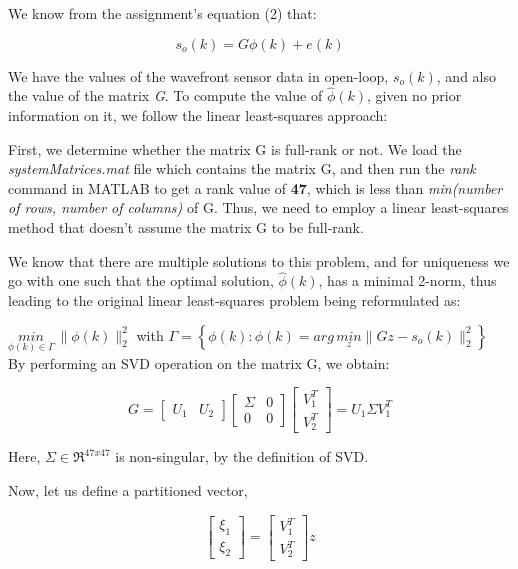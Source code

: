 \documentclass[12pt]{report}
\begin{document}
We know from the assignment's equation (2) that:

\begin{equation*}
	s_{o}(k) = G\phi(k) + e(k)
\end{equation*}

We have the values of the wavefront sensor data in open-loop, $s_{o}(k)$, and also the value of the matrix \textit{G}. To compute the value of $\hat\phi(k)$, given no prior information on it, we follow the linear least-squares approach:

First, we determine whether the matrix G is full-rank or not. We load the \textit{systemMatrices.mat} file which contains the matrix G, and then run the \textit{rank} command in MATLAB to get a rank value of \textbf{47}, which is less than \textit{min(number of rows, number of columns)} of G. Thus, we need to employ a linear least-squares method that doesn't assume the matrix G to be full-rank.

We know that there are multiple solutions to this problem, and for uniqueness we go with one such that the optimal solution, $\hat\phi(k)$, has a minimal 2-norm, thus leading to the original linear least-squares problem being reformulated as:

$\underset{\phi(k) \in \Gamma}{min} \, \|\phi(k)\|_{2}^{2}$ \space	with \space	$\Gamma = \left\{ \phi(k) : \phi(k) = arg \, \underset{z}{min} \| Gz - s_{o}(k)\|_{2}^{2}\right\}$
\\
By performing an SVD operation on the matrix G, we obtain:

\begin{equation*}
G = \begin{bmatrix}
U_{1} & U_{2}
\end{bmatrix}\begin{bmatrix}
\Sigma & 0 \\
0 & 0
\end{bmatrix}
\begin{bmatrix}
V_{1}^{T} \\
V_{2}^{T}
\end{bmatrix}
= U_{1}\Sigma V_{1}^{T}
\end{equation*}

Here, $\Sigma \in \Re^{47x47}$ is non-singular, by the definition of SVD. 

Now, let us define a partitioned vector,

\begin{equation*}
\begin{bmatrix}
\xi_{1} \\
\xi_{2}
\end{bmatrix}
=
\begin{bmatrix}
V_{1}^{T} \\
V_{2}^{T}
\end{bmatrix}z
\end{equation*}
\end{document}
